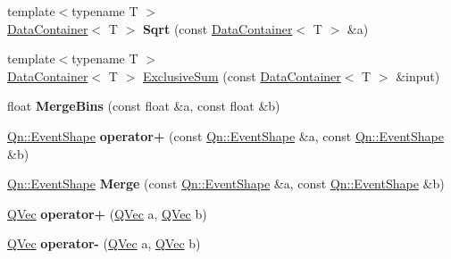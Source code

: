 \begin{DoxyCompactItemize}
\item 
\mbox{\label{namespaceQn_a704817e14f401d06b3ef4edff40e1368}} 
{\footnotesize template$<$typename T $>$ }\\\mbox{\hyperlink{classQn_1_1DataContainer}{Data\+Container}}$<$ T $>$ {\bfseries Sqrt} (const \mbox{\hyperlink{classQn_1_1DataContainer}{Data\+Container}}$<$ T $>$ \&a)
\item 
{\footnotesize template$<$typename T $>$ }\\\mbox{\hyperlink{classQn_1_1DataContainer}{Data\+Container}}$<$ T $>$ \mbox{\hyperlink{namespaceQn_a1b9d91b6c7e55713ee9dfe893fd8e13a}{Exclusive\+Sum}} (const \mbox{\hyperlink{classQn_1_1DataContainer}{Data\+Container}}$<$ T $>$ \&input)
\item 
\mbox{\label{namespaceQn_a66147b6887c148ec2ac4cd3354c0f4ca}} 
float {\bfseries Merge\+Bins} (const float \&a, const float \&b)
\item 
\mbox{\label{namespaceQn_af6faad4b6aa0558b92947720e38858a8}} 
\mbox{\hyperlink{classQn_1_1EventShape}{Qn\+::\+Event\+Shape}} {\bfseries operator+} (const \mbox{\hyperlink{classQn_1_1EventShape}{Qn\+::\+Event\+Shape}} \&a, const \mbox{\hyperlink{classQn_1_1EventShape}{Qn\+::\+Event\+Shape}} \&b)
\item 
\mbox{\label{namespaceQn_a8f77befaba234fa58aeedd8010c188a4}} 
\mbox{\hyperlink{classQn_1_1EventShape}{Qn\+::\+Event\+Shape}} {\bfseries Merge} (const \mbox{\hyperlink{classQn_1_1EventShape}{Qn\+::\+Event\+Shape}} \&a, const \mbox{\hyperlink{classQn_1_1EventShape}{Qn\+::\+Event\+Shape}} \&b)
\item 
\mbox{\label{namespaceQn_a3b70880c108e38361a08f6102cd0163c}} 
\mbox{\hyperlink{structQn_1_1QVec}{Q\+Vec}} {\bfseries operator+} (\mbox{\hyperlink{structQn_1_1QVec}{Q\+Vec}} a, \mbox{\hyperlink{structQn_1_1QVec}{Q\+Vec}} b)
\item 
\mbox{\label{namespaceQn_a534f7c03dd9db058d5a44361211febbf}} 
\mbox{\hyperlink{structQn_1_1QVec}{Q\+Vec}} {\bfseries operator-\/} (\mbox{\hyperlink{structQn_1_1QVec}{Q\+Vec}} a, \mbox{\hyperlink{structQn_1_1QVec}{Q\+Vec}} b)
\item 
\mbox{\label{namespaceQn_a672b09a013aaef4e4dbc0004827152b0}} 

\end{DoxyCompactItemize}
